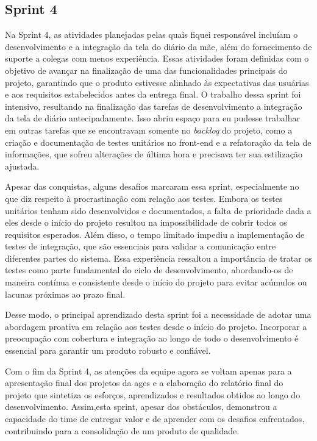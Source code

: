 \subsection{Sprint 4}

Na Sprint 4, as atividades planejadas pelas quais fiquei responsável incluíam o desenvolvimento e a integração da tela do diário da mãe, além do fornecimento de suporte a colegas com menos experiência. Essas atividades foram definidas com o objetivo de avançar na finalização de uma das funcionalidades principais do projeto, garantindo que o produto estivesse alinhado às expectativas das usuárias e aos requisitos estabelecidos antes da entrega final. O trabalho dessa sprint foi intensivo, resultando na finalização das tarefas de desenvolvimento a integração da tela de diário antecipadamente. Isso abriu espaço para eu pudesse trabalhar em outras tarefas que se encontravam somente no \textit{backlog} do projeto, como a criação e documentação de testes unitários no front-end e a refatoração da tela de informações, que sofreu alterações de última hora e precisava ter sua estilização ajustada.

Apesar das conquistas, alguns desafios marcaram essa sprint, especialmente no que diz respeito à procrastinação com relação aos testes. Embora os testes unitários tenham sido desenvolvidos e documentados, a falta de prioridade dada a eles desde o início do projeto resultou na impossibilidade de cobrir todos os requisitos esperados. Além disso, o tempo limitado impediu a implementação de testes de integração, que são essenciais para validar a comunicação entre diferentes partes do sistema. Essa experiência ressaltou a importância de tratar os testes como parte fundamental do ciclo de desenvolvimento, abordando-os de maneira contínua e consistente desde o início do projeto para evitar acúmulos ou lacunas próximas ao prazo final.

Desse modo, o principal aprendizado desta sprint foi a necessidade de adotar uma abordagem proativa em relação aos testes desde o início do projeto. Incorporar a preocupação com cobertura e integração ao longo de todo o desenvolvimento é essencial para garantir um produto robusto e confiável.

Com o fim da Sprint 4, as atenções da equipe agora se voltam apenas para a apresentação final dos projetos da \ac{ages} e a elaboração do relatório final do projeto que sintetiza os esforços, aprendizados e resultados obtidos ao longo do desenvolvimento. Assim,esta sprint, apesar dos obstáculos, demonstrou a capacidade do time de entregar valor e de aprender com os desafios enfrentados, contribuindo para a consolidação de um produto de qualidade.